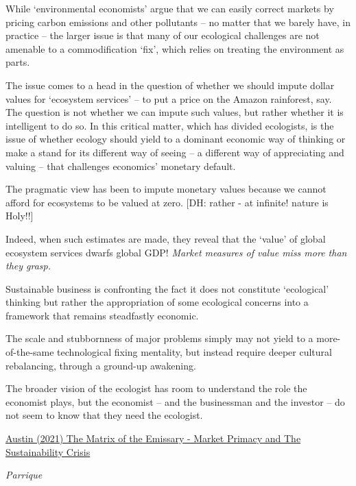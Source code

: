 \documentclass[
]{book}
\begin{document}
While `environmental economists' argue that we can easily correct markets by pricing carbon emissions and other pollutants -- no matter that we barely have, in practice -- the larger issue is that many of our ecological challenges are not amenable to a commodification `fix', which relies on treating the environment as parts.

The issue comes to a head in the question of whether we should impute dollar values for `ecosystem services' -- to put a price on the Amazon rainforest, say. The question is not whether we can impute such values, but rather whether it is intelligent to do so. In this critical matter, which has divided ecologists, is the issue of whether ecology should yield to a dominant economic way of thinking or make a stand for its different way of seeing -- a different way of appreciating and valuing -- that challenges economics' monetary default.

The pragmatic view has been to impute monetary values because we cannot afford for ecosystems to be valued at zero. {[}DH: rather - at infinite! nature is Holy!!{]}

Indeed, when such estimates are made, they reveal that the `value' of global ecosystem services dwarfs global GDP! \emph{Market measures of value miss more than they grasp.}

Sustainable business is confronting the fact it does not constitute `ecological' thinking but rather the appropriation of some ecological concerns into a framework that remains steadfastly economic.

The scale and stubbornness of major problems simply may not yield to a more-of-the-same technological fixing mentality, but instead require deeper cultural rebalancing, through a ground-up awakening.

The broader vision of the ecologist has room to understand the role the economist plays, but the economist -- and the businessman and the investor -- do not seem to know that they need the ecologist.

\href{https://channelmcgilchrist.com/articles/the-matrix-of-the-emissary/}{Austin (2021) The Matrix of the Emissary - Market Primacy and The Sustainability Crisis}

\emph{Parrique}
\end{document}

